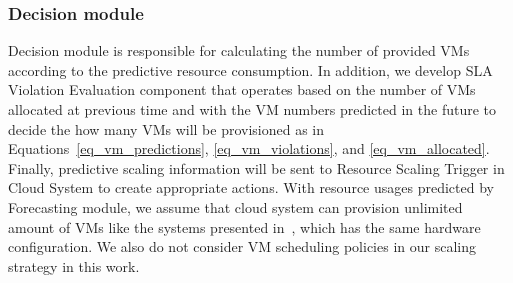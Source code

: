 \documentclass[runningheads]{llncs}
\begin{document}
\subsubsection{Decision module}
\label{decision_module}
Decision module is responsible for calculating the number of provided VMs according to the predictive resource consumption. In addition, we develop SLA Violation Evaluation component that operates based on the number of VMs allocated at previous time and with the VM numbers predicted in the future to decide the how many VMs will be provisioned as in Equations~\ref{eq_vm_predictions}, \ref{eq_vm_violations}, and \ref{eq_vm_allocated}. 
Finally, predictive scaling information will be sent to Resource Scaling Trigger in Cloud System to create appropriate actions.
With resource usages predicted by Forecasting module, we assume that cloud system can provision unlimited amount of VMs like the systems presented in~\cite{ref_nguyen}, which has the same hardware configuration. We also do not consider VM scheduling policies in our scaling strategy in this work. 
%



\end{document}
